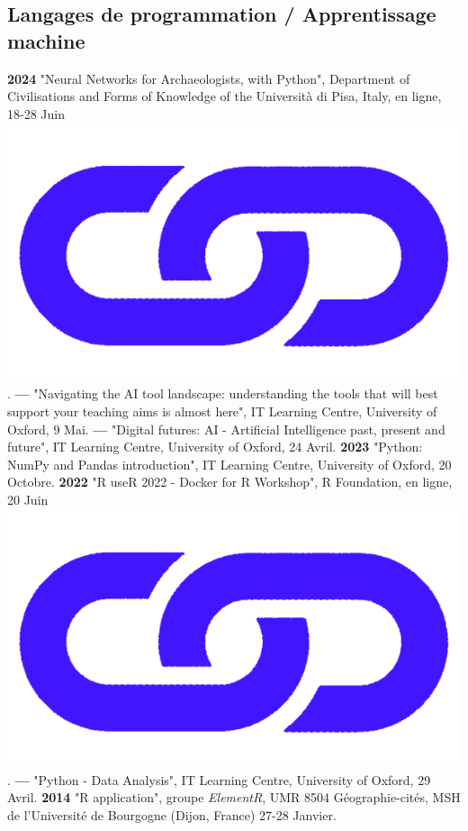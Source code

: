 \documentclass{article}
\begin{document}
\subsection*{Langages de programmation / Apprentissage machine}

\textbf{2024 }"Neural Networks for Archaeologists, with \textsf{Python}", Department of Civilisations and Forms of Knowledge of the Università di Pisa, Italy, en ligne, 18-28 Juin \href{https://www.unipi.it/index.php/humanities/item/26801-neural-networks-archaeologists-python}{\includegraphics[scale=0.02]{link_darkblue.png}}.
\smallbreak
\textbf{--- }"Navigating the AI tool landscape: understanding the tools that will best support your teaching aims is almost here", IT Learning Centre, University of Oxford, 9 Mai.
\smallbreak
\textbf{--- }"Digital futures: AI - Artificial Intelligence past, present and future", IT Learning Centre, University of Oxford, 24 Avril.
\smallbreak
\textbf{2023 }"\textsf{Python}: NumPy and Pandas introduction", IT Learning Centre, University of Oxford, 20 Octobre.
\smallbreak
\textbf{2022 }"\textsf{R} useR 2022 - Docker for R Workshop", R Foundation, en ligne, 20 Juin \href{https://github.com/rsangole/user2022-r-for-docker}{\includegraphics[scale=0.02]{link_darkblue.png}}.
\smallbreak
\textbf{--- }"\textsf{Python} - Data Analysis", IT Learning Centre, University of Oxford, 29 Avril.
\smallbreak
\textbf{2014 }"\textsf{R} application", groupe \textit{ElementR}, UMR 8504 G\'{e}ographie-cit\'{e}s, MSH de l'Universit\'{e} de Bourgogne (Dijon, France) 27-28 Janvier.
\smallbreak
\end{document}
